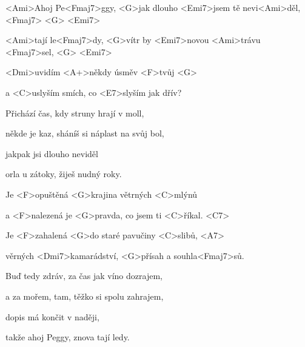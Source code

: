 


\zs
<Ami>Ahoj Pe<Fmaj7>ggy, <G>jak dlouho <Emi7>jsem tě nevi<Ami>děl, <Fmaj7> <G> <Emi7>

<Ami>tají le<Fmaj7>dy, <G>vítr by <Emi7>novou <Ami>trávu <Fmaj7>sel, <G> <Emi7>

<Dmi>uvidím <A+>někdy úsměv <F>tvůj <G>

a <C>uslyším smích, co <E7>slyším jak dřív?
\ks

\zs
Přichází čas, kdy struny hrají v moll,

někde je kaz, sháníš si náplast na svůj bol,

jakpak jsi dlouho neviděl

orla u zátoky, žiješ nudný roky.
\ks

\zr
Je <F>opuštěná <G>krajina větrných <C>mlýnů

a <F>nalezená je <G>pravda, co jsem ti <C>říkal. <C7>

Je <F>zahalená <G>do staré pavučiny <C>slibů, <A7>

věrných <Dmi7>kamarádství, <G>přísah a souhla<Fmaj7>sů.
\kr

\zs
Buď tedy zdráv, za čas jak víno dozrajem,

a za mořem, tam, těžko si spolu zahrajem,

dopis má končit v naději,

takže ahoj Peggy, znova tají ledy.
\ks

\kp
